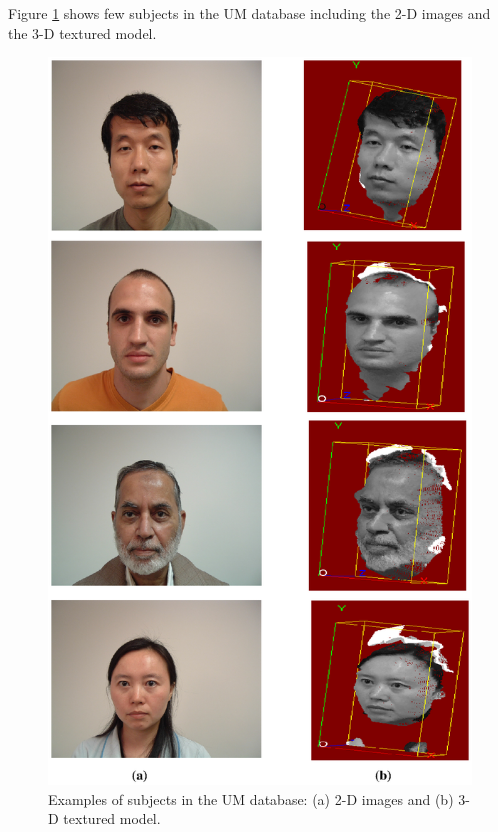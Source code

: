 {Figure \ref{fig_UM_database_3-D} shows few subjects in the UM
database including the 2-D images and the 3-D textured model.
\begin{figure}[tbp]
\begin{center}
  \includegraphics[scale = 0.8]{./chapters/Figures/um_database_samples.eps}
  \caption{Examples of subjects in the UM database: (a) 2-D images and (b) 3-D textured model.}\label{fig_UM_database_3-D}
\end{center}
\end{figure}
}
